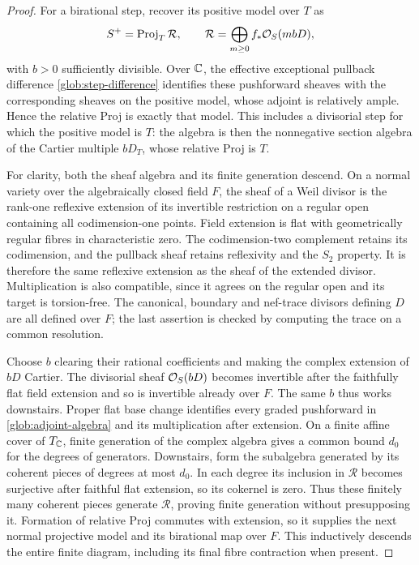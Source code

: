 \begin{proof}
For a birational step, recover its positive model over $T$ as
\begin{equation}\label{glob:adjoint-algebra}
 S^+=\operatorname{Proj}_T\mathcal R,
 \qquad
 \mathcal R=\bigoplus_{m\geq0}f_*\mathcal O_S(mbD),
\end{equation}
with $b>0$ sufficiently divisible.  Over $\mathbb C$, the effective exceptional
pullback difference \eqref{glob:step-difference} identifies these
pushforward sheaves with the corresponding sheaves on the positive
model, whose adjoint is relatively ample.  Hence the relative Proj is
exactly that model.  This includes a divisorial step for which the
positive model is $T$: the algebra is then the nonnegative section
algebra of the Cartier multiple $bD_T$, whose relative Proj is $T$.

For clarity, both the sheaf algebra and its finite generation descend.
On a normal variety over the algebraically closed field $F$, the sheaf
of a Weil divisor is the rank-one reflexive extension of its invertible
restriction on a regular open containing all codimension-one points.
Field extension is flat with geometrically regular fibres in
characteristic zero.  The codimension-two complement retains its
codimension, and the pullback sheaf retains reflexivity and the $S_2$
property.  It is therefore the same reflexive extension as the sheaf of
the extended divisor.  Multiplication is also compatible, since it
agrees on the regular open and its target is torsion-free.  The
canonical, boundary and nef-trace divisors defining $D$ are all defined
over $F$; the last assertion is checked by computing the trace on a
common resolution.

Choose $b$ clearing their rational coefficients and making the complex
extension of $bD$ Cartier.  The divisorial sheaf $\mathcal O_S(bD)$ becomes
invertible after the faithfully flat field extension and so is
invertible already over $F$.  The same $b$ thus works downstairs.
Proper flat base change identifies every graded pushforward in
\eqref{glob:adjoint-algebra} and its multiplication after extension.
On a finite affine cover of $T_\mathbb C$, finite generation of the complex
algebra gives a common bound $d_0$ for the degrees of generators.
Downstairs, form the subalgebra generated by its coherent pieces of
degrees at most $d_0$.  In each degree its inclusion in $\mathcal R$
becomes surjective after faithful flat extension, so its cokernel is
zero.  Thus these finitely many coherent pieces generate $\mathcal R$,
proving finite generation without presupposing it.  Formation of
relative Proj commutes with extension, so it supplies the next normal
projective model and its birational map over $F$.  This inductively
descends the entire finite diagram, including its final fibre
contraction when present.


\end{proof}
